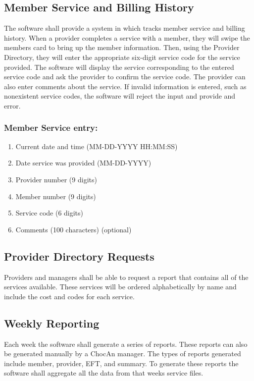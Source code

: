 \documentclass{article}
\begin{document}
\subsection{Member Service and Billing History}
The software shall provide a system in which tracks member service and billing history. When a provider completes a service with a member, they will swipe the members card to bring up the member information. Then, using the Provider Directory, they will enter the appropriate six-digit service code for the service provided. The software will display the service corresponding to the entered service code and ask the provider to confirm the service code. The provider can also enter comments about the service. If invalid information is entered, such as nonexistent service codes, the software will reject the input and provide and error. 

\subsubsection{Member Service entry:}
\begin{enumerate}
\item Current date and time (MM-DD-YYYY HH:MM:SS)
\item Date service was provided (MM-DD-YYYY)
\item Provider number (9 digits)
\item Member number (9 digits)
\item Service code (6 digits)
\item Comments (100 characters) (optional)
\end{enumerate}

\subsection{Provider Directory Requests}
Providers and managers shall be able to request a report that contains all of the services available. These services will be ordered alphabetically by name and include the cost and codes for each service.

\subsection{Weekly Reporting}
Each week the software shall generate a series of reports. These reports can also be generated manually by a ChocAn manager. The types of reports generated include member, provider, EFT, and summary. To generate these reports the software shall aggregate all the data from that weeks service files.
\end{document}
